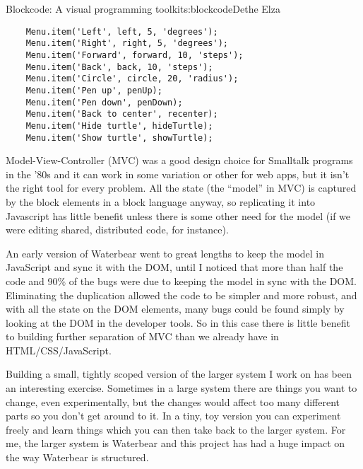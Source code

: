 \begin{aosachapter}{Blockcode: A visual programming toolkit}{s:blockcode}{Dethe Elza}
\begin{verbatim}
    Menu.item('Left', left, 5, 'degrees');
    Menu.item('Right', right, 5, 'degrees');
    Menu.item('Forward', forward, 10, 'steps');
    Menu.item('Back', back, 10, 'steps');
    Menu.item('Circle', circle, 20, 'radius');
    Menu.item('Pen up', penUp);
    Menu.item('Pen down', penDown);
    Menu.item('Back to center', recenter);
    Menu.item('Hide turtle', hideTurtle);
    Menu.item('Show turtle', showTurtle);
\end{verbatim}

\label{lessons-learned}

\label{why-not-use-mvc}

Model-View-Controller (MVC) was a good design choice for Smalltalk
programs in the '80s and it can work in some variation or other for web
apps, but it isn't the right tool for every problem. All the state (the
``model'' in MVC) is captured by the block elements in a block language
anyway, so replicating it into Javascript has little benefit unless
there is some other need for the model (if we were editing shared,
distributed code, for instance).

An early version of Waterbear went to great lengths to keep the model in
JavaScript and sync it with the DOM, until I noticed that more than half
the code and 90\% of the bugs were due to keeping the model in sync with
the DOM. Eliminating the duplication allowed the code to be simpler and
more robust, and with all the state on the DOM elements, many bugs could
be found simply by looking at the DOM in the developer tools. So in this
case there is little benefit to building further separation of MVC than
we already have in HTML/CSS/JavaScript.

\label{toy-changes-can-lead-to-real-changes}

Building a small, tightly scoped version of the larger system I work on
has been an interesting exercise. Sometimes in a large system there are
things you want to change, even experimentally, but the changes would
affect too many different parts so you don't get around to it. In a
tiny, toy version you can experiment freely and learn things which you
can then take back to the larger system. For me, the larger system is
Waterbear and this project has had a huge impact on the way Waterbear is
structured.

\label{small-experiments-make-failure-ok}


\end{aosachapter}
